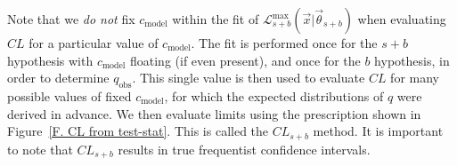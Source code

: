 Note that we \textit{do not} fix $c_\text{model}$ within the fit of $\mathcal{L}^\text{max}_{s+b}\left(\vec{x}|\vec{\theta}_{s+b}\right)$ when evaluating $CL$ for a particular value of $c_\text{model}$. The fit is performed once for the $s+b$ hypothesis with $c_\text{model}$ floating (if even present), and once for the $b$ hypothesis, in order to determine $q_\text{obs}$. This single value is then used to evaluate $CL$ for many possible values of fixed $c_\text{model}$, for which the expected distributions of $q$ were derived in advance. We then evaluate limits using the prescription shown in Figure~\ref{F. CL from test-stat}. This is called the $\textit{CL}_{s+b}$ method. It is important to note that $CL_{s+b}$ results in true frequentist confidence intervals.




